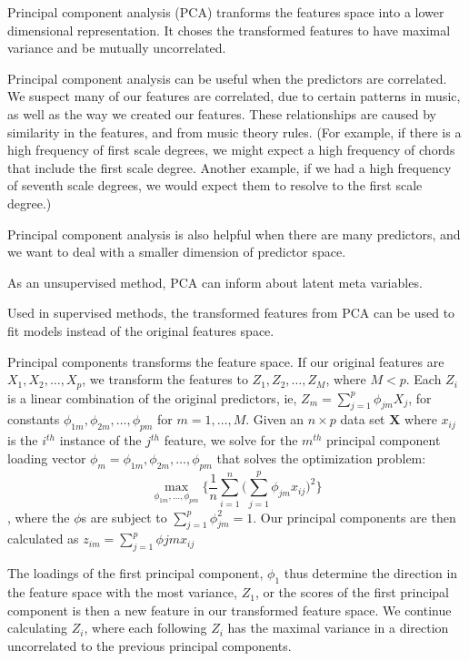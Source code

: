 \documentclass[12pt,twoside]{reedthesis}
\theoremstyle{definition}
\theoremstyle{definition}
\theoremstyle{definition}
\theoremstyle{remark}
\begin{document}
Principal component analysis (PCA) tranforms the features space into a
lower dimensional representation. It choses the transformed features to
have maximal variance and be mutually uncorrelated.

Principal component analysis can be useful when the predictors are
correlated. We suspect many of our features are correlated, due to
certain patterns in music, as well as the way we created our features.
These relationships are caused by similarity in the features, and from
music theory rules. (For example, if there is a high frequency of first
scale degrees, we might expect a high frequency of chords that include
the first scale degree. Another example, if we had a high frequency of
seventh scale degrees, we would expect them to resolve to the first
scale degree.)

Principal component analysis is also helpful when there are many
predictors, and we want to deal with a smaller dimension of predictor
space.

As an unsupervised method, PCA can inform about latent meta variables.

Used in supervised methods, the transformed features from PCA can be
used to fit models instead of the original features space.

Principal components transforms the feature space. If our original
features are \(X_1,X_2,\ldots,X_p\), we transform the features to
\(Z_1,Z_2,\ldots,Z_M\), where \(M < p\). Each \(Z_i\) is a linear
combination of the original predictors, ie,
\(Z_m = \sum_{j = 1}^p \phi_{jm}X_j\), for constants
\(\phi_{1m},\phi_{2m},\ldots,\phi_{pm}\) for \(m = 1,\ldots,M\). Given
an \(n\times p\) data set \(\mathbf{X}\) where \(x_{ij}\) is the
\(i^{th}\) instance of the \(j^{th}\) feature, we solve for the
\(m^{th}\) principal component loading vector
\(\phi_m = \phi_{1m},\phi_{2m},\ldots,\phi_{pm}\) that solves the
optimization problem:
\[\max_{\phi_{1m},\ldots,\phi_{pm}} \bigg\{\frac{1}{n}\sum_{i=1}^n\bigg(\sum_{j=1}^p \phi_{jm}x_{ij}\bigg)^2\bigg\}\],
where the \(\phi\)s are subject to \(\sum_{j = 1}^p\phi_{jm}^2 = 1\).
Our principal components are then calculated as
\(z_{im} = \sum_{j = 1}^p\phi{jm}x_{ij}\)

The loadings of the first principal component, \(\phi_1\) thus determine
the direction in the feature space with the most variance, \(Z_1\), or
the scores of the first principal component is then a new feature in our
transformed feature space. We continue calculating \(Z_i\), where each
following \(Z_i\) has the maximal variance in a direction uncorrelated
to the previous principal components.
\end{document}

